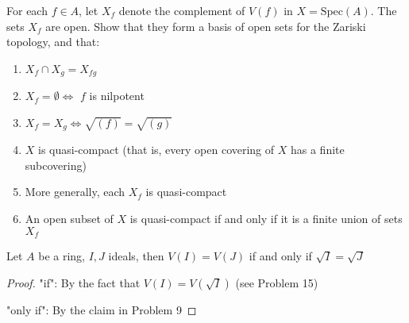 \documentclass{solution}
\begin{document}
\begin{problem}
    For each $f \in A$, let $X_f$ denote the complement of $V(f)$ in $X = \mathrm{Spec}(A)$. The sets $X_f$ are open. Show that they form a basis of open sets for the Zariski topology, and that:
    \begin{enumerate}
        \item $X_f \cap X_g = X_{fg}$
        \item $X_f = \emptyset \Leftrightarrow$ $f$ is nilpotent
        \item $X_f = X_g \Leftrightarrow \sqrt{(f)} = \sqrt{(g)}$
        \item $X$ is quasi-compact (that is, every open covering of $X$ has a finite subcovering)
        \item More generally, each $X_f$ is quasi-compact
        \item An open subset of $X$ is quasi-compact if and only if it is a finite union of sets $X_f$
    \end{enumerate}
\end{problem}

\begin{lemma}
    Let $A$ be a ring, $I, J$ ideals, then $V(I) = V(J)$ if and only if $\sqrt{I} = \sqrt{J}$
\end{lemma}

\begin{proof}
    "if": By the fact that $V(I) = V(\sqrt{I})$ (see Problem 15)

    "only if": By the claim in Problem 9
\end{proof}
\end{document}
